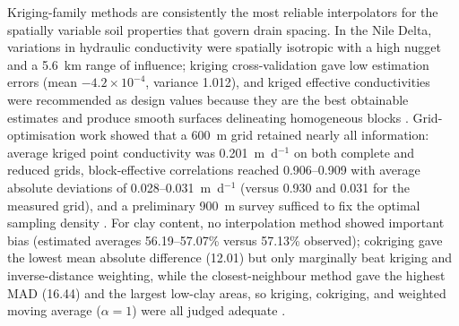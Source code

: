 Kriging-family methods are consistently the most reliable interpolators for the
spatially variable soil properties that govern drain spacing. In the Nile Delta,
variations in hydraulic conductivity were spatially isotropic with a high nugget
and a 5.6~km range of influence; kriging cross-validation gave low estimation
errors (mean $-4.2\times10^{-4}$, variance 1.012), and kriged effective
conductivities were recommended as design values because they are the best
obtainable estimates and produce smooth surfaces delineating homogeneous blocks
\parencite{GALLICHAND1991}. Grid-optimisation work showed that a 600~m grid
retained nearly all information: average kriged point conductivity was
0.201~m~d$^{-1}$ on both complete and reduced grids, block-effective correlations
reached 0.906--0.909 with average absolute deviations of 0.028--0.031~m~d$^{-1}$
(versus 0.930 and 0.031 for the measured grid), and a preliminary 900~m survey
sufficed to fix the optimal sampling density \parencite{GALLICHAND1992}. For clay
content, no interpolation method showed important bias (estimated averages
56.19--57.07\% versus 57.13\% observed); cokriging gave the lowest mean absolute
difference (12.01) but only marginally beat kriging and inverse-distance
weighting, while the closest-neighbour method gave the highest MAD (16.44) and
the largest low-clay areas, so kriging, cokriging, and weighted moving average
($\alpha=1$) were all judged adequate \parencite{GALLICHAND1993}.

